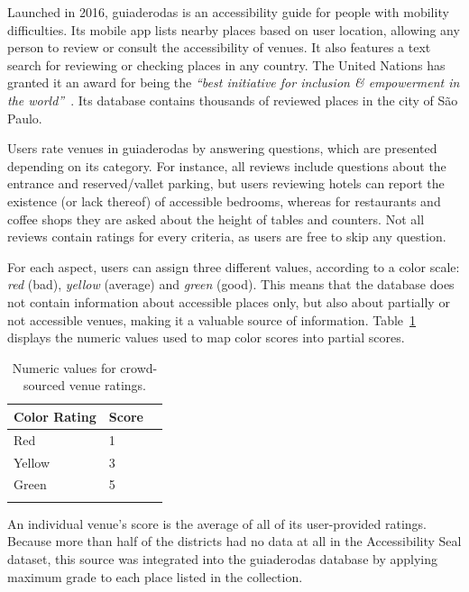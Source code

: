\documentclass[12pt]{article}
\begin{document}
Launched in 2016, guiaderodas is an accessibility guide for people with mobility difficulties.
Its mobile app lists nearby places based on user location,
allowing any person to review or consult the accessibility of venues.
It also features a text search for reviewing or checking places in any country.
The United Nations has granted it an award for being the \emph{``best initiative for inclusion \& empowerment in the world''}~\cite{belloni-gdr, yuge-gdr}.
Its database contains thousands of reviewed places in the city of São Paulo.

Users rate venues in guiaderodas by answering questions, which are presented depending on its category.
For instance, all reviews include questions about the entrance and reserved/vallet parking,
but users reviewing hotels can report the existence (or lack thereof) of accessible bedrooms,
whereas for restaurants and coffee shops they are asked about the height of tables and counters.
Not all reviews contain ratings for every criteria, as users are free to skip any question.

For each aspect, users can assign three different values, according to a color scale:
\textit{red} (bad), \textit{yellow} (average) and \textit{green} (good).
This means that the database does not contain information about accessible places only,
but also about partially or not accessible venues,
making it a valuable source of information.
Table~\ref{tab:color_scores} displays the numeric values used to map color scores into partial scores.

\begin{table}[h]
  \centering
  \begin{tabular}{llr}
    \bottomrule\addlinespace[0.3em]
    Color Rating & Score \\
    \bottomrule\addlinespace[0.3em]
    Red    & 1 \\
    Yellow & 3 \\
    Green  & 5 \\
    \addlinespace[0.3em]
    \bottomrule
  \end{tabular}
  \caption{Numeric values for crowd-sourced venue ratings.}
  \label{tab:color_scores}
\end{table}

An individual venue's score is the average of all of its user-provided ratings.
Because more than half of the districts had no data at all in the Accessibility Seal dataset,
this source was integrated into the guiaderodas database by applying maximum grade to each place listed in the collection.
\end{document}
